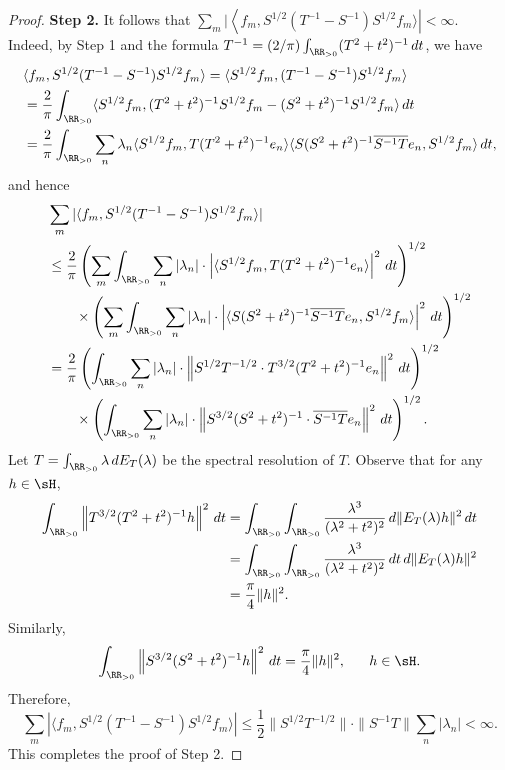 \documentclass[12pt]{article}
\theoremstyle{plain}
\numberwithin{equation}{section}
\theoremstyle{remark}
\begin{document}
\begin{proof}
\textbf{Step 2.} It follows that $\sum_m|\left\langle f_m,S^{1/2}(T^{-1}-S^{-1})S^{1/2}f_m\rangle\right|<\infty$.\\
Indeed, by Step 1 and the formula $T^{-1}=(2/\pi)\int_{\RR_{>0}}(T^2+t^2)^{-1}\,dt$, we have
\begin{align*}
&\langle f_m,S^{1/2}(T^{-1}-S^{-1})S^{1/2}f_m\rangle = \langle S^{1/2}f_m,(T^{-1}-S^{-1})S^{1/2}f_m\rangle\\
&= \frac{2}{\pi}\int_{\RR_{>0}}\langle S^{1/2}f_m,(T^2+t^2)^{-1}S^{1/2}f_m-(S^2+t^2)^{-1}S^{1/2}f_m\rangle\,dt\\
&= \frac{2}{\pi}\int_{\RR_{>0}}\sum_n
\lambda_n\langle S^{1/2}f_m,T(T^2+t^2)^{-1}e_n\rangle\langle S(S^2+t^2)^{-1}\overline{S^{-1}T}e_n,S^{1/2}f_m\rangle\,dt,
\end{align*}
and hence
\begin{align*}
& \sum_m|\langle f_m,S^{1/2}(T^{-1}-S^{-1})S^{1/2}f_m\rangle|\\
& \leq \frac{2}{\pi}\left(\sum_m\int_{\RR_{>0}}\sum_n|\lambda_n|\cdot\left|\langle S^{1/2}f_m,T(T^2+t^2)^{-1}e_n\rangle\right|^2\,dt\right)^{1/2}\\
& \qquad 
  \times\left(\sum_m\int_{\RR_{>0}}\sum_n|\lambda_n|\cdot\left|\langle S(S^2+t^2)^{-1}\overline{S^{-1}T}e_n,S^{1/2}f_m\rangle\right|^2\,dt\right)^{1/2}\\
& = \frac{2}{\pi}\left(\int_{\RR_{>0}}\sum_n|\lambda_n|\cdot\left\|S^{1/2}T^{-1/2}\cdot T^{3/2}(T^2+t^2)^{-1}e_n\right\|^2\,dt\right)^{1/2}\\
& \qquad 
  \times\left(\int_{\RR_{>0}}\sum_n|\lambda_n|\cdot\left\|S^{3/2}(S^2+t^2)^{-1}\cdot\overline{S^{-1}T}e_n\right\|^2\,dt\right)^{1/2}.
\end{align*}
Let $T=\int_{\RR_{>0}}\lambda\,dE_T(\lambda)$ be the spectral resolution of $T$.
Observe that for any $h\in\sH$,
\begin{align*}
 \int_{\RR_{>0}}\left\|T^{3/2}(T^2+t^2)^{-1}h\right\|^2\,dt
& = \int_{\RR_{>0}}\int_{\RR_{>0}}\frac{\lambda^3}{(\lambda^2+t^2)^2}\,d\|E_T(\lambda)h\|^2\,dt\\
& = \int_{\RR_{>0}}\int_{\RR_{>0}}\frac{\lambda^3}{(\lambda^2+t^2)^2}\,dt\,d\|E_T(\lambda)h\|^2 \\
& = \frac{\pi}{4}\|h\|^2.
\end{align*}
Similarly, 
\[
\int_{\RR_{>0}}\left\|S^{3/2}(S^2+t^2)^{-1}h\right\|^2\,dt =  \frac{\pi}{4}\|h\|^2, \ \ \ \ \ h\in\sH.
\]
Therefore, 
\[
\sum_m\left|\langle f_m,S^{1/2}(T^{-1}-S^{-1})S^{1/2}f_m\rangle\right| 
\leq \frac{1}{2}\|S^{1/2}T^{-1/2}\|\cdot\|S^{-1}T\|\sum_n|\lambda_n|
< \infty.
\]
This completes the proof of Step 2.


\end{proof}
\end{document}
